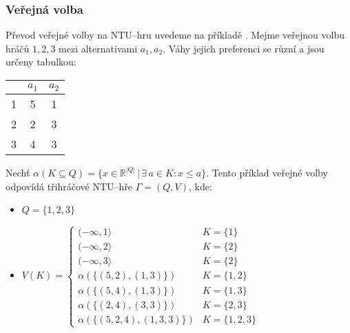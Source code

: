         \subsubsection*{Veřejná volba}
            Převod veřejné volby na NTU--hru uvedeme na příkladě \cite[str. 120]{Game_Theory}. Mejme veřejnou volbu hráčů $1, 2, 3$ mezi alternativami $a_1, a_2$. Váhy jejich preferenci se různí a jsou určeny tabulkou:

            \begin{table}[!h]
                \centering
                \begin{tabular}{|c||c|c|}
                    \hline
                    & $a_1$ & $a_2$\\
                    \hline\hline
                    1 & 5 & 1 \\
                    \hline
                    2 & 2 & 3 \\
                    \hline
                    3 & 4 & 3 \\
                    \hline
                \end{tabular}
            \end{table}

            Nechť $\alpha(K \subseteq Q) = \{x \in \mathbb{R}^{|Q|}\,|\, \exists\, a \in K:  x \leqslant a\}$. Tento příklad veřejné volby odpovídá třihráčové NTU--hře $\Gamma = (Q, V)$, kde:
            \begin{itemize}
                \vspace*{-0.3em}
                \item $Q = \{1,2,3\}$
                \item $V(K) = \begin{cases}
                    (-\infty, 1\rangle & K = \{1\}\\
                    (-\infty, 2\rangle & K = \{2\}\\
                    (-\infty, 3\rangle & K = \{2\}\\
                    \alpha(\{(5, 2), (1, 3)\}) & K = \{1,2\}\\
                    \alpha(\{(5, 4), (1, 3)\}) & K = \{1,3\}\\
                    \alpha(\{(2, 4), (3, 3)\}) & K = \{2, 3\}\\
                    \alpha(\{(5, 2, 4), (1, 3, 3)\}) & K = \{1,2,3\}
                \end{cases}$
            \end{itemize}

